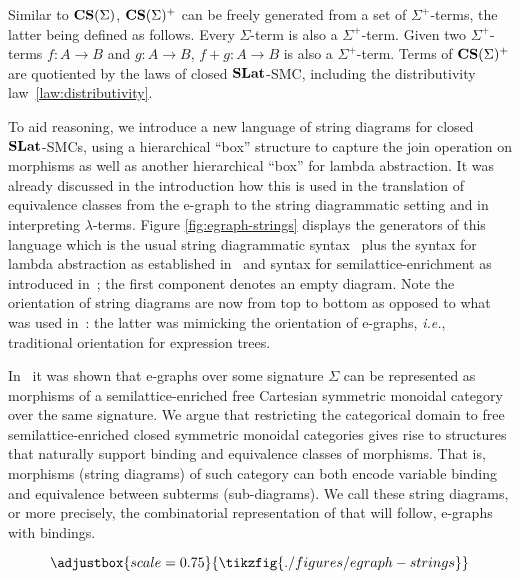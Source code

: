 Similar to $\mathbf{CS}(\Sigma)$, $\mathbf{CS}(\Sigma)^{+}$ can be freely generated from a set of $\Sigma^{+}$-terms, the latter being defined as follows.
Every $\Sigma$-term is also a $\Sigma^{+}$-term. 
Given two $\Sigma^{+}$-terms $f : A \to B$ and $g : A \to B$, $f + g : A \to B$ is also a $\Sigma^{+}$-term.
Terms of $\mathbf{CS}(\Sigma)^{+}$ are quotiented by the laws of closed $\mathbf{SLat}$-SMC, including the distributivity law~\ref{law:distributivity}.


To aid reasoning, we introduce a new language of string diagrams for closed $\mathbf{SLat}$-SMCs, using a hierarchical ``box'' structure to capture the join operation on morphisms as well as another hierarchical ``box'' for lambda abstraction.
It was already discussed in the introduction how this is  used in the translation of equivalence classes from the e-graph to the string diagrammatic setting and in interpreting $\lambda$-terms.
Figure \ref{fig:egraph-strings} displays the generators of this language which is the usual string diagrammatic syntax~\cite{Selinger_2010} plus the syntax for lambda abstraction as established in~\cite{ghica2024stringdiagramslambdacalculifunctional} and syntax for semilattice-enrichment as introduced in~\cite{ghica2024equivalencehypergraphsegraphsmonoidal}; the first component denotes an empty diagram.
Note the orientation of string diagrams are now from top to bottom as opposed to what was used in~: the latter was mimicking the orientation of e-graphs, \textit{i.e.}, traditional orientation for expression trees.

In~\cite{ghica2024stringdiagramslambdacalculifunctional} it was shown that e-graphs over some signature $\Sigma$ can be represented as morphisms of a semilattice-enriched free Cartesian symmetric monoidal category over the same signature.
We argue that restricting the categorical domain to free semilattice-enriched closed symmetric monoidal categories gives rise to structures that naturally support binding and equivalence classes of morphisms.
That is, morphisms (string diagrams) of such category can both encode variable binding and equivalence between subterms (sub-diagrams).
We call these string diagrams, or more precisely, the combinatorial representation of that will follow, e-graphs with bindings.

\begin{figure*}
\[
\adjustbox{scale=0.75}{
\tikzfig{./figures/egraph-strings}
}
\]
\caption{String diagrams for closed semilattice-enriched symmetric monoidal categories.}
\label{fig:egraph-strings}
\end{figure*}